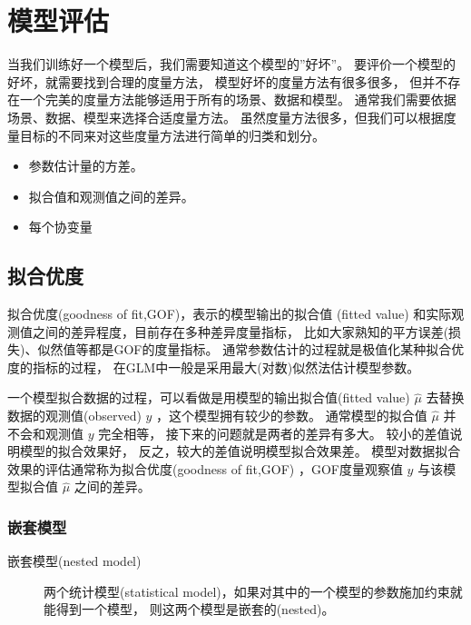 \documentclass[letterpaper,10pt,english]{sphinxmanual}
\begin{document}
\chapter{模型评估}
\label{\detokenize{_u6a21_u578b_u8bc4_u4f30/content:id1}}\label{\detokenize{_u6a21_u578b_u8bc4_u4f30/content::doc}}
当我们训练好一个模型后，我们需要知道这个模型的”好坏”。
要评价一个模型的好坏，就需要找到合理的度量方法，
模型好坏的度量方法有很多很多，
但并不存在一个完美的度量方法能够适用于所有的场景、数据和模型。
通常我们需要依据场景、数据、模型来选择合适度量方法。
虽然度量方法很多，但我们可以根据度量目标的不同来对这些度量方法进行简单的归类和划分。
\begin{itemize}
\item {} 
参数估计量的方差。

\item {} 
拟合值和观测值之间的差异。

\item {} 
每个协变量

\end{itemize}


\section{拟合优度}
\label{\detokenize{_u6a21_u578b_u8bc4_u4f30/content:id2}}
拟合优度(goodness of fit,GOF)，表示的模型输出的拟合值 (fitted value)
和实际观测值之间的差异程度，目前存在多种差异度量指标，
比如大家熟知的平方误差(损失)、似然值等都是GOF的度量指标。
通常参数估计的过程就是极值化某种拟合优度的指标的过程，
在GLM中一般是采用最大(对数)似然法估计模型参数。

一个模型拟合数据的过程，可以看做是用模型的输出拟合值(fitted value) \(\hat{\mu}\)
去替换数据的观测值(observed) \(y\)
，这个模型拥有较少的参数。
通常模型的拟合值 \(\hat{\mu}\)
并不会和观测值 \(y\) 完全相等，
接下来的问题就是两者的差异有多大。
较小的差值说明模型的拟合效果好，
反之，较大的差值说明模型拟合效果差。
模型对数据拟合效果的评估通常称为拟合优度(goodness of fit,GOF)
，GOF度量观察值 \(y\) 与该模型拟合值 \(\hat{\mu}\) 之间的差异。


\subsection{嵌套模型}
\label{\detokenize{_u6a21_u578b_u8bc4_u4f30/content:id3}}\begin{description}
\item[{嵌套模型(nested model)\label{\detokenize{_u6a21_u578b_u8bc4_u4f30/content:term-nested-model}}}] \leavevmode
两个统计模型(statistical model)，如果对其中的一个模型的参数施加约束就能得到一个模型，
则这两个模型是嵌套的(nested)。

\end{description}
\end{document}
